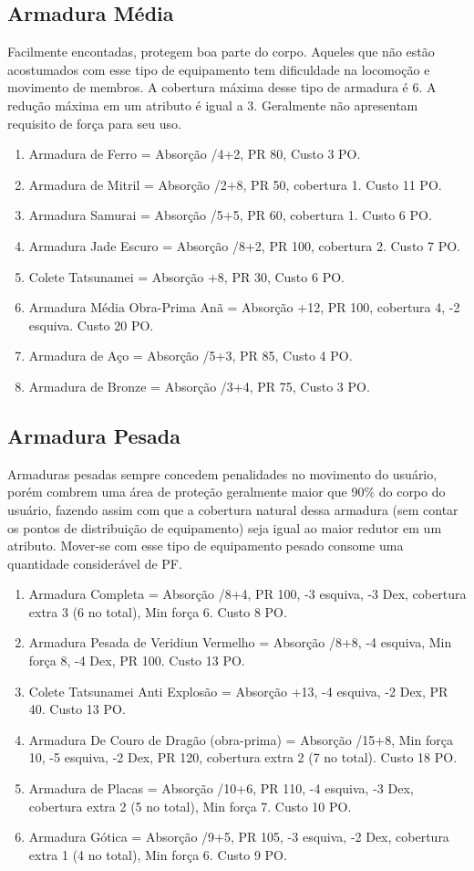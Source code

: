 \subsection{Armadura Média}
Facilmente encontadas, protegem boa parte do corpo. Aqueles que não estão acostumados com esse tipo de equipamento tem dificuldade na locomoção e movimento de membros. A cobertura máxima desse tipo de armadura é 6. A redução máxima em um atributo é igual a 3. Geralmente não apresentam requisito de força para seu uso.

\begin{enumerate}
	\item Armadura de Ferro = Absorção /4+2, PR 80, Custo 3 PO.
	\item Armadura de Mitril = Absorção /2+8, PR 50, cobertura 1. Custo 11 PO.
	\item Armadura Samurai = Absorção /5+5, PR 60, cobertura 1. Custo 6 PO.
	\item Armadura Jade Escuro = Absorção /8+2, PR 100, cobertura 2. Custo 7 PO.
	\item Colete Tatsunamei = Absorção +8, PR 30, Custo 6 PO.		
	\item Armadura Média Obra-Prima Anã = Absorção +12, PR 100, cobertura 4, -2 esquiva. Custo 20 PO.	
	\item Armadura de Aço = Absorção /5+3, PR 85, Custo 4 PO.
	\item Armadura de Bronze = Absorção /3+4, PR 75, Custo 3 PO.		
\end{enumerate}


\subsection{Armadura Pesada}
Armaduras pesadas sempre concedem penalidades no movimento do usuário, porém combrem uma área de proteção geralmente maior que 90\% do corpo do usuário, fazendo assim com que a cobertura natural dessa armadura (sem contar os pontos de distribuição de equipamento) seja igual ao maior redutor em um atributo. Mover-se com esse tipo de equipamento pesado consome uma quantidade considerável de PF. 

\begin{enumerate}
	\item Armadura Completa = Absorção /8+4, PR 100, -3 esquiva, -3 Dex, cobertura extra 3 (6 no total), Min força 6. Custo 8 PO.
	\item Armadura Pesada de Veridiun Vermelho = Absorção /8+8, -4 esquiva, Min força 8, -4 Dex, PR 100. Custo 13 PO.
	\item Colete Tatsunamei Anti Explosão = Absorção +13, -4 esquiva, -2 Dex, PR 40. Custo 13 PO.
	\item Armadura De Couro de Dragão (obra-prima) = Absorção /15+8, Min força 10, -5 esquiva, -2 Dex, PR 120, cobertura extra 2 (7 no total). Custo 18 PO.
	\item Armadura de Placas = Absorção /10+6, PR 110, -4 esquiva, -3 Dex, cobertura extra 2 (5 no total), Min força 7. Custo 10 PO.
	\item Armadura Gótica = Absorção /9+5, PR 105, -3 esquiva, -2 Dex, cobertura extra 1 (4 no total), Min força 6. Custo 9 PO.
\end{enumerate}


